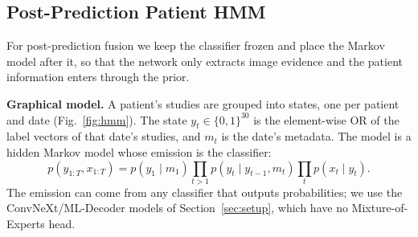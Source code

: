 \documentclass[conference]{IEEEtran}
\begin{document}
\subsection{Post-Prediction Patient HMM}
\label{sec:hmm}
For post-prediction fusion we keep the classifier frozen and place the Markov model after it, so that the network only extracts image evidence and the patient information enters through the prior.

\textbf{Graphical model.} A patient's studies are grouped into states, one per patient and date (Fig.~\ref{fig:hmm}). The state $y_t \in \{0,1\}^{30}$ is the element-wise OR of the label vectors of that date's studies, and $m_t$ is the date's metadata. The model is a hidden Markov model whose emission is the classifier:
\begin{equation}
p(y_{1:T}, x_{1:T}) = p(y_1 \mid m_1) \prod_{t>1} p(y_t \mid y_{t-1}, m_t) \prod_{t} p(x_t \mid y_t).
\label{eq:hmm}
\end{equation}
The emission can come from any classifier that outputs probabilities; we use the ConvNeXt/ML-Decoder models of Section~\ref{sec:setup}, which have no Mixture-of-Experts head.
\end{document}
